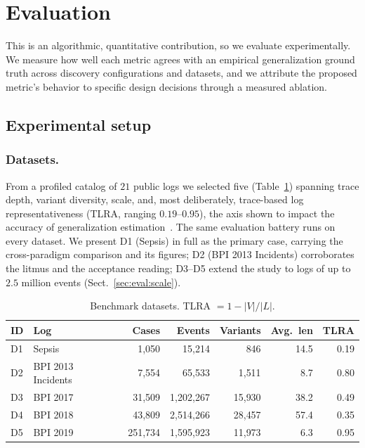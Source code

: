 \documentclass[runningheads]{llncs}
\newcommand{\chg}[1]{\textcolor{chgblue}{#1}}
\begin{document}
\section{Evaluation}
\label{sec:eval}
This is an algorithmic, quantitative contribution, so we evaluate experimentally. We measure how well each metric agrees with an empirical generalization ground truth across discovery configurations and datasets, and we attribute the proposed metric's behavior to specific design decisions through \chg{a measured ablation}.

\subsection{Experimental setup}
\label{sec:eval:setup}

\subsubsection{Datasets.}
From a profiled catalog of \chg{$21$} public logs we selected five (Table~\ref{tab:datasets}) spanning trace depth, variant diversity, scale, and, most deliberately, \chg{trace-based log representativeness (TLRA, ranging $0.19$--$0.95$), the axis shown to impact the accuracy of generalization estimation~\cite{karunaratne2024representativeness}}. The same evaluation battery runs on every dataset. We present D1 (Sepsis) in full as the primary case, carrying the cross-paradigm comparison and its figures; D2 (BPI 2013 Incidents) corroborates the litmus and the acceptance reading\chg{; D3--D5 extend the study to logs of up to $2.5$ million events (Sect.~\ref{sec:eval:scale})}.

\begin{table}[t]
\centering
\caption{Benchmark datasets. TLRA $=1-|V|/|L|$.}
\label{tab:datasets}
\setlength{\tabcolsep}{3pt}
\footnotesize
\begin{tabular}{@{}llrrrrr@{}}
\toprule
ID & Log & Cases & Events & Variants & Avg.\ len & TLRA \\
\midrule
D1 & Sepsis~\cite{mannhardt2016sepsis} & 1{,}050 & 15{,}214 & 846 & 14.5 & 0.19 \\
D2 & BPI 2013 Incidents\chg{~\cite{steeman2013bpi}} & 7{,}554 & 65{,}533 & 1{,}511 & 8.7 & 0.80 \\
D3 & BPI 2017\chg{~\cite{vandongen2017bpi}} & 31{,}509 & 1{,}202{,}267 & 15{,}930 & 38.2 & 0.49 \\
D4 & BPI 2018\chg{~\cite{vandongen2018bpi}} & 43{,}809 & 2{,}514{,}266 & 28{,}457 & 57.4 & 0.35 \\
D5 & BPI 2019\chg{~\cite{vandongen2019bpi}} & 251{,}734 & 1{,}595{,}923 & 11{,}973 & 6.3 & 0.95 \\
\bottomrule
\end{tabular}
\end{table}
\end{document}
